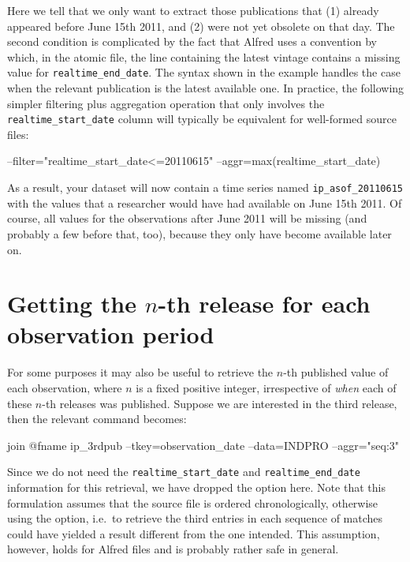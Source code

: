 \begin{itemize}
  Here we tell  that we only want to extract those
  publications that (1) already appeared before June 15th 2011, and
  (2) were not yet obsolete on that day. The second condition is
  complicated by the fact that Alfred uses a convention by which, in
  the atomic file, the line containing the latest vintage contains a
  missing value for \texttt{realtime\_end\_date}. The syntax shown in
  the example handles the case when the relevant publication is the
  latest available one. In practice, the following simpler filtering
  plus aggregation operation that only involves the
  \verb|realtime_start_date| column will typically be equivalent for
  well-formed source files: 
\end{itemize}
\begin{code}
  --filter="realtime_start_date<=20110615" --aggr=max(realtime_start_date)
\end{code}
As a result, your dataset will now contain a time series named
\verb|ip_asof_20110615| with the values that a researcher would have
had available on June 15th 2011. Of course, all values for the
observations after June 2011 will be missing (and probably a few
before that, too), because they only have become available later on.

\section{Getting the $n$-th release for each observation period}

For some purposes it may also be useful to retrieve the $n$-th published
value of each observation, where $n$ is a fixed positive integer,
irrespective of \emph{when} each of these $n$-th releases was
published. Suppose we are interested in the third release, then the
relevant  command becomes:
\begin{code}
  join @fname ip_3rdpub --tkey=observation_date --data=INDPRO --aggr="seq:3"
\end{code}
Since we do not need the \verb|realtime_start_date| and
\verb|realtime_end_date| information for this retrieval, we have
dropped the  option here. Note that this formulation
assumes that the source file is ordered chronologically, otherwise
using the  option, i.e.\ to retrieve the third
entries in each sequence of matches could have yielded a result
different from the one intended. This assumption, however, holds for
Alfred files and is probably rather safe in general.

